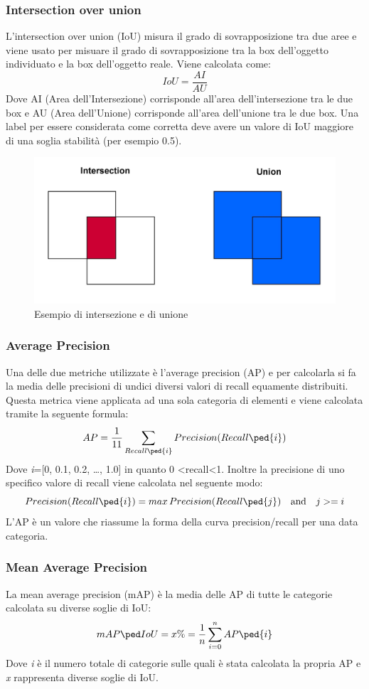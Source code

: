 \subsubsection{Intersection over union}
L'intersection over union (IoU) misura il grado di sovrapposizione tra due aree e viene usato per misuare il grado di sovrapposizione tra la box dell'oggetto individuato e la box dell'oggetto reale. Viene calcolata come:
\[
    IoU = \frac{AI}{AU}
\]
Dove AI (Area dell'Intersezione) corrisponde all'area dell'intersezione tra le due box e AU (Area dell'Unione) corrisponde all'area dell'unione tra le due box.
Una label per essere considerata come corretta deve avere un valore di IoU maggiore di una soglia stabilità (per esempio 0.5).
\begin{figure}[H]
	\centering
	\includegraphics[width=0.5\linewidth]{images/unione-intersezione.jpg}
	\caption{Esempio di intersezione e di unione}
	\label{Esempio di intersezione e di unione}
\end{figure}
\subsubsection{Average Precision}
Una delle due metriche utilizzate è l'average precision (AP) e per calcolarla si fa la media delle precisioni di undici diversi valori di recall equamente distribuiti. Questa metrica viene applicata ad una sola categoria di elementi e viene calcolata tramite la seguente formula:
\[
    AP = \frac{1}{11}\sum_{Recall\ped{i}}^{} Precision(Recall\ped{i})
\]
Dove \textit{i}=[0, 0.1, 0.2, …, 1.0] in quanto 0 \textless  recall\textless 1. Inoltre la precisione di uno specifico valore di recall viene calcolata nel seguente modo:
\[
    Precision(Recall\ped{i}) = max\,Precision(Recall\ped{j}) \quad \textrm{and} \quad j>=i
\]
L'AP è un valore che riassume la forma della curva precision/recall per una data categoria.
\subsubsection{Mean Average Precision}
La mean average precision (mAP) è la media delle AP di tutte le categorie calcolata su diverse soglie di IoU:
\[
    mAP\ped{IoU=x\%} = \frac{1}{n}\sum_{i=0}^{n}AP\ped{i}
\]
Dove \textit{i} è il numero totale di categorie sulle quali è stata calcolata la propria AP e \textit{x} rappresenta diverse soglie di IoU.




